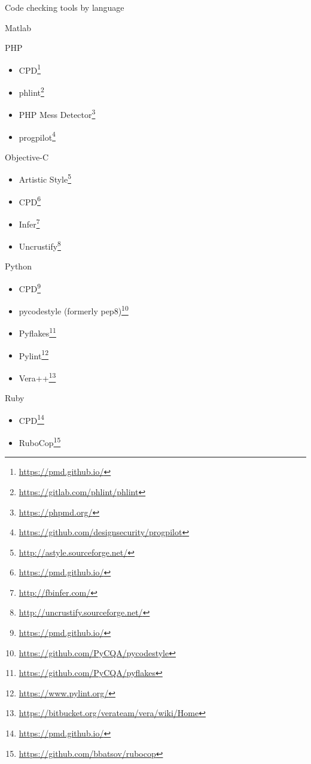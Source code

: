 \documentclass[presentation]{beamer}
\newcommand{\fnurl}[1]{\footnote{\url{#1}}}
\begin{document}
\begin{frame}{Code checking tools by language}
\begin{block}{Matlab}
    \end{block}
    \begin{block}{PHP}
        \begin{itemize}
            \item CPD\fnurl{https://pmd.github.io/}
            \item phlint\fnurl{https://gitlab.com/phlint/phlint}
            \item PHP Mess Detector\fnurl{https://phpmd.org/}
            \item progpilot\fnurl{https://github.com/designsecurity/progpilot}
        \end{itemize}
    \end{block}
    \begin{block}{Objective-C}
        \begin{itemize}
            \item Artistic Style\fnurl{http://astyle.sourceforge.net/}
            \item CPD\fnurl{https://pmd.github.io/}
            \item Infer\fnurl{http://fbinfer.com/}
            \item Uncrustify\fnurl{http://uncrustify.sourceforge.net/}
        \end{itemize}
    \end{block}
    \begin{block}{Python}
        \begin{itemize}
            \item CPD\fnurl{https://pmd.github.io/}
            \item pycodestyle (formerly pep8)\fnurl{https://github.com/PyCQA/pycodestyle}
            \item Pyflakes\fnurl{https://github.com/PyCQA/pyflakes}
            \item Pylint\fnurl{https://www.pylint.org/}
            \item Vera++\fnurl{https://bitbucket.org/verateam/vera/wiki/Home}
        \end{itemize}
    \end{block}
    \begin{block}{Ruby}
        \begin{itemize}
            \item CPD\fnurl{https://pmd.github.io/}
            \item RuboCop\fnurl{https://github.com/bbatsov/rubocop}
        \end{itemize}
    \end{block}

\end{frame}
\end{document}

